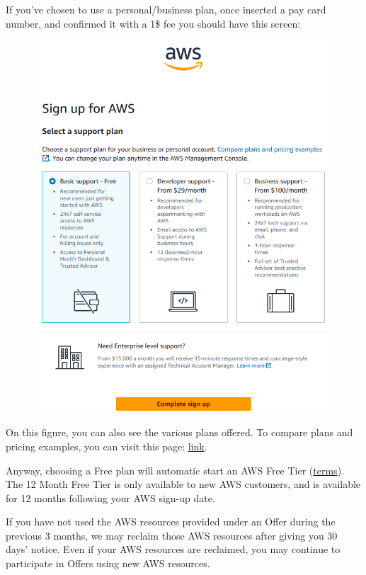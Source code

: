 \documentclass[a4paper]{article}
\begin{document}
    \noindent
    If you've chosen to use a personal/business plan, once inserted a pay card number, and confirmed it with a 1\$ fee you should have this screen:
    \begin{figure}[!htp]
        \centering
        \includegraphics[width=\textwidth]{img/sing-up.png}
    \end{figure}

    \noindent
    On this figure, you can also see the various plans offered. To compare plans and pricing examples, you can visit this page: \href{https://aws.amazon.com/premiumsupport/plans/}{link}.\newline

    \noindent
    Anyway, choosing a Free plan will automatic start an AWS Free Tier (\href{https://aws.amazon.com/free/terms/}{terms}). The 12 Month Free Tier is only available to new AWS customers, and is available for 12 months following your AWS sign-up date.

    If you have not used the AWS resources provided under an Offer during the previous 3 months, we may reclaim those AWS resources after giving you 30 days’ notice. Even if your AWS resources are reclaimed, you may continue to participate in Offers using new AWS resources.
\end{document}
